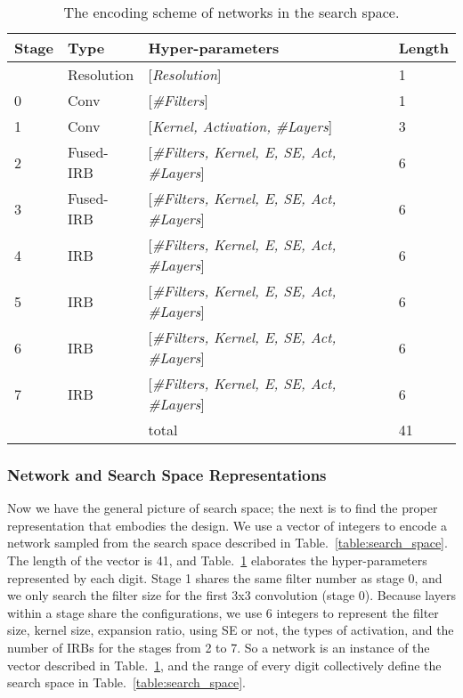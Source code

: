 \documentclass[10pt,twocolumn,letterpaper]{article}
\begin{document}
\begin{table}[!tb]
\footnotesize
\setlength{\tabcolsep}{0.2em}
  \centering
    \vspace{-0.5cm}
    \begin{tabular}{ l l l l}
    \toprule
          {Stage} & {Type} &  Hyper-parameters & Length\\
    	  \midrule
    	          & Resolution & [\textit{Resolution}] & 1 \\
		  0       & Conv       & [\textit{\#Filters}]     & 1 \\
		  1       & Conv       & [\textit{Kernel, Activation, \#Layers}] & 3 \\
		  2       & Fused-IRB  & [\textit{\#Filters, Kernel, E, SE, Act, \#Layers}] & 6 \\
		  3       & Fused-IRB  & [\textit{\#Filters, Kernel, E, SE, Act, \#Layers}] & 6 \\
		  4       & IRB        & [\textit{\#Filters, Kernel, E, SE, Act, \#Layers}] & 6 \\
		  5       & IRB        & [\textit{\#Filters, Kernel, E, SE, Act, \#Layers}] & 6 \\
		  6       & IRB        & [\textit{\#Filters, Kernel, E, SE, Act, \#Layers}] & 6 \\
		  7       & IRB        & [\textit{\#Filters, Kernel, E, SE, Act, \#Layers}] & 6 \\
	\midrule
            &     & total      & 41 \\
    \bottomrule
    \end{tabular}
    \vspace{-0.2cm}
     \caption{The encoding scheme of networks in the search space.}
     \label{table:encoding_scheme}
     \vspace{-0.2cm}
\end{table}



\subsubsection{Network and Search Space Representations}
Now we have the general picture of search space; the next is to find the proper representation that embodies the design. We use a vector of integers to encode a network sampled from the search space described in Table.~\ref{table:search_space}. The length of the vector is 41, and Table.~\ref{table:encoding_scheme} elaborates the hyper-parameters represented by each digit. Stage 1 shares the same filter number as stage 0, and we only search the filter size for the first 3x3 convolution (stage 0). Because layers within a stage share the configurations, we use 6 integers to represent the filter size, kernel size, expansion ratio, using SE or not, the types of activation, and the number of IRBs for the stages from 2 to 7. So a network is an instance of the vector described in Table.~\ref{table:encoding_scheme}, and the range of every digit collectively define the search space in Table.~\ref{table:search_space}.
\end{document}
